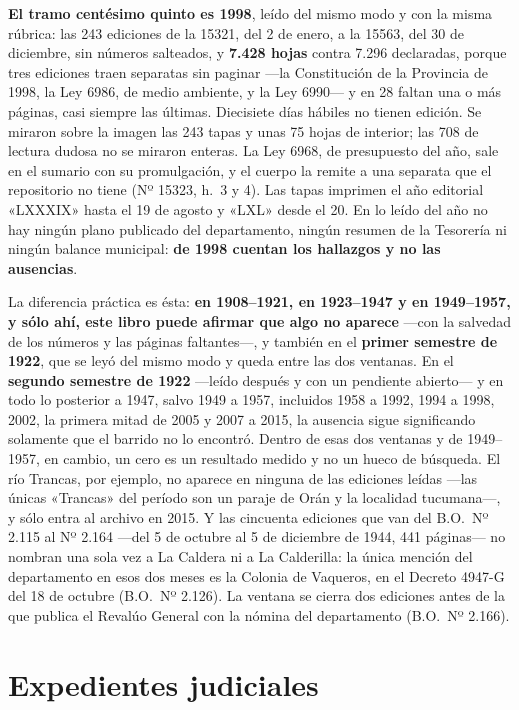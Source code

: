 \textbf{El tramo centésimo quinto es 1998}, leído del mismo modo y con la misma rúbrica: las 243 ediciones de la 15321, del 2 de enero, a la 15563, del 30 de diciembre, sin números salteados, y \textbf{7.428 hojas} contra 7.296 declaradas, porque tres ediciones traen separatas sin paginar ---la Constitución de la Provincia de 1998, la Ley 6986, de medio ambiente, y la Ley 6990--- y en 28 faltan una o más páginas, casi siempre las últimas. Diecisiete días hábiles no tienen edición. Se miraron sobre la imagen las 243 tapas y unas 75 hojas de interior; las 708 de lectura dudosa no se miraron enteras. La Ley 6968, de presupuesto del año, sale en el sumario con su promulgación, y el cuerpo la remite a una separata que el repositorio no tiene (Nº 15323, h.\ 3 y 4). Las tapas imprimen el año editorial «LXXXIX» hasta el 19 de agosto y «LXL» desde el 20. En lo leído del año no hay ningún plano publicado del departamento, ningún resumen de la Tesorería ni ningún balance municipal: \textbf{de 1998 cuentan los hallazgos y no las ausencias}.

La diferencia práctica es ésta: \textbf{en 1908--1921, en 1923--1947 y en 1949--1957, y sólo ahí, este libro
puede afirmar que algo no aparece} ---con la salvedad de los números y las páginas faltantes---, y también en el \textbf{primer semestre de 1922}, que se leyó del mismo modo y queda entre las dos ventanas. En el \textbf{segundo semestre de 1922} ---leído después y con un pendiente abierto--- y en todo lo posterior a 1947, salvo 1949 a 1957, incluidos 1958 a 1992, 1994 a 1998, 2002, la primera mitad de 2005 y 2007 a 2015, la ausencia sigue significando solamente
que el barrido no lo encontró. Dentro de esas dos ventanas y de 1949--1957, en cambio, un cero es un resultado
medido y no un hueco de búsqueda. El río Trancas, por ejemplo, no aparece en ninguna de las
ediciones leídas ---las únicas «Trancas» del período son un paraje de Orán y la localidad
tucumana---, y sólo entra al archivo en 2015. Y las cincuenta ediciones que van del
B.O.\ Nº 2.115 al Nº 2.164 ---del 5 de octubre al 5 de diciembre de 1944, 441 páginas--- no
nombran una sola vez a La Caldera ni a La Calderilla: la única mención del departamento en esos
dos meses es la Colonia de Vaqueros, en el Decreto 4947-G del 18 de octubre (B.O.\ Nº 2.126).
La ventana se cierra dos ediciones antes de la que publica el Revalúo General con la nómina del departamento (B.O.\ Nº 2.166).

\section{Expedientes judiciales}

